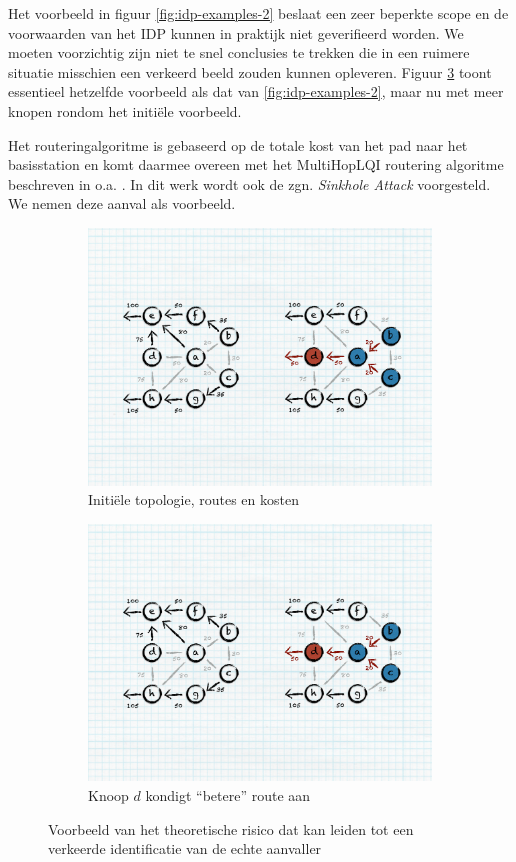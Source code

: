 Het voorbeeld in figuur \ref{fig:idp-examples-2} beslaat een zeer beperkte
scope en de voorwaarden van het IDP kunnen in praktijk niet geverifieerd
worden. We moeten voorzichtig zijn niet te snel conclusies te trekken die in
een ruimere situatie misschien een verkeerd beeld zouden kunnen opleveren.
Figuur \ref{fig:sinkhole-ripple} toont essentieel hetzelfde voorbeeld als dat
van \ref{fig:idp-examples-2}, maar nu met meer knopen rondom het initi\"ele
voorbeeld.

Het routeringalgoritme is gebaseerd op de totale kost van het pad naar het
basisstation en komt daarmee overeen met het MultiHopLQI routering algoritme
beschreven in o.a. \citep{krontiris2008launching}. In dit werk wordt ook de
zgn. \emph{Sinkhole Attack} voorgesteld. We nemen deze aanval als voorbeeld.

\begin{figure}[ht]
\centering
\begin{subfigure}{.49\textwidth}
  \centering
  \includegraphics[width=.8\linewidth]{./resources/sinkhole-before.pdf}
  \caption{Initi\"ele topologie, routes en kosten}
  \label{fig:sinkhole-ripple-1}
\end{subfigure}
\begin{subfigure}{.49\textwidth}
  \centering
  \includegraphics[width=.8\linewidth]{./resources/sinkhole-after.pdf}
  \caption{Knoop $d$ kondigt ``betere'' route aan}
  \label{fig:sinkhole-ripple-2}
\end{subfigure}
\caption{Voorbeeld van het theoretische risico dat kan leiden tot een verkeerde
identificatie van de echte aanvaller}
\label{fig:sinkhole-ripple}
\end{figure}

